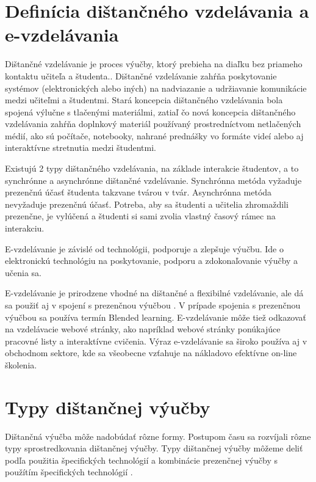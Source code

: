 \documentclass[10pt,oneside,slovak,a4paper]{article}
\begin{document}
\section{Definícia dištančného vzdelávania a e-vzdelávania}
\label{rozdiely}
Dištančné vzdelávanie je proces výučby, ktorý prebieha na diaľku bez priameho kontaktu učiteľa a študenta.\cite{India}. %
Dištančné vzdelávanie zahŕňa poskytovanie systémov (elektronických alebo iných) na nadviazanie a udržiavanie komunikácie medzi učiteľmi a študentmi.
Stará koncepcia dištančného vzdelávania bola spojená výlučne s tlačenými materiálmi, zatiaľ čo nová koncepcia dištančného vzdelávania zahŕňa doplnkový materiál používaný prostredníctvom netlačených médií, ako sú počítače, notebooky, nahrané prednášky vo formáte videí alebo aj interaktívne stretnutia medzi študentmi.

Existujú 2 typy dištančného vzdelávania, na základe interakcie študentov, a to synchrónne a asynchrónne dištančné vzdelávanie. %
Synchrónna metóda vyžaduje prezenčnú účasť študenta takzvane tvárou v tvár. %
Asynchrónna metóda nevyžaduje prezenčnú účasť.
Potreba, aby sa študenti a učitelia zhromaždili prezenčne, je vylúčená a študenti si sami zvolia vlastný časový rámec na interakciu. %

E-vzdelávanie je závislé od technológii, podporuje a zlepšuje výučbu. Ide o elektronickú technológiu na poskytovanie, podporu a zdokonaľovanie výučby a učenia sa. 

E-vzdelávanie je prirodzene vhodné na dištančné a flexibilné vzdelávanie, ale dá sa použiť aj v spojení s prezenčnou výučbou \cite{elearningDef}. %
V prípade spojenia s prezenčnou výučbou sa používa termín Blended learning. %
E-vzdelávanie môže tiež odkazovať na vzdelávacie webové stránky, ako napríklad webové stránky ponúkajúce pracovné listy a interaktívne cvičenia.
Výraz e-vzdelávanie sa široko používa aj v obchodnom sektore, kde sa všeobecne vzťahuje na nákladovo efektívne on-line školenia.

\section{Typy dištančnej výučby}
\label{typy}
Dištančná výučba môže nadobúdať rôzne formy. Postupom času sa rozvíjali rôzne typy sprostredkovania dištančnej výučby. Typy dištančnej výučby môžeme deliť podľa použitia
špecifických technológií a kombinácie prezenčnej výučby s použítím špecifických technológií \cite{WiktorzakKotowski}. 
\end{document}
